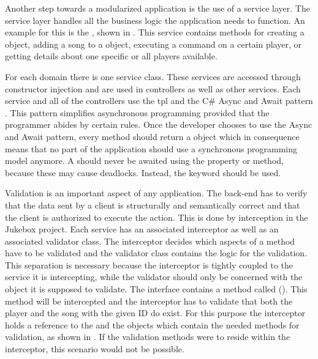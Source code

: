 

Another step towards a modularized application is the use of a service layer. The service layer handles all the business logic the application needs to function. An example for this is the , shown in . This service contains methods for creating a  object, adding a song to a  object, executing a command on a certain player, or getting details about one specific or all players available.

For each domain there is one service class. These services are accessed through constructor injection and are used in controllers as well as other services. Each service and all of the controllers use the \gls{tpl} and the C\# Async and Await pattern \cite{tpl}. This pattern simplifies asynchronous programming provided that the programmer abides by certain rules. Once the developer chooses to use the Async and Await pattern, every method should return a  object which in consequence means that no part of the application should use a synchronous programming model anymore. A  should never be awaited using the  property or  method, because these may cause deadlocks. Instead, the  keyword should be used.


Validation is an important aspect of any application. The back-end has to verify that the data sent by a client is structurally and semantically correct and that the client is authorized to execute the action. This is done by interception in the Jukebox project. Each service has an associated interceptor as well as an associated validator class. The interceptor decides which aspects of a method have to be validated and the validator class contains the logic for the validation. This separation is necessary because the interceptor is tightly coupled to the service it is intercepting, while the validator should only be concerned with the object it is supposed to validate. The  interface contains a method called  (). This method will be intercepted and the interceptor has to validate that both the player and the song with the given ID do exist. For this purpose the interceptor holds a reference to the  and the  objects which contain the needed methods for validation, as shown in . If the validation methods were to reside within the interceptor, this scenario would not be possible.

